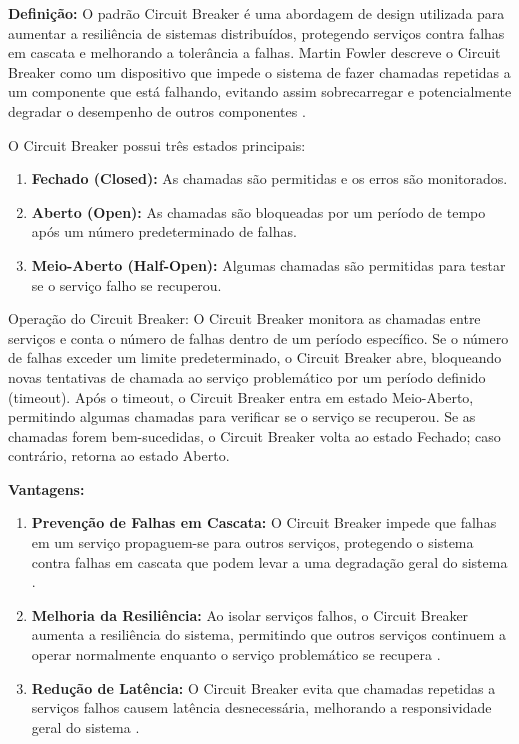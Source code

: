 \textbf{Definição:} O padrão Circuit Breaker é uma abordagem de design utilizada para aumentar a resiliência de sistemas distribuídos, protegendo serviços contra falhas em cascata e melhorando a tolerância a falhas. Martin Fowler descreve o Circuit Breaker como um dispositivo que impede o sistema de fazer chamadas repetidas a um componente que está falhando, evitando assim sobrecarregar e potencialmente degradar o desempenho de outros componentes \cite{fowler2014}.

O Circuit Breaker possui três estados principais:

\begin{enumerate}
    \item \textbf{Fechado (Closed):} As chamadas são permitidas e os erros são monitorados.
    \item \textbf{Aberto (Open):} As chamadas são bloqueadas por um período de tempo após um número predeterminado de falhas.
    \item \textbf{Meio-Aberto (Half-Open):} Algumas chamadas são permitidas para testar se o serviço falho se recuperou.

\end{enumerate}
{Operação do Circuit Breaker:} O Circuit Breaker monitora as chamadas entre serviços e conta o número de falhas dentro de um período específico. Se o número de falhas exceder um limite predeterminado, o Circuit Breaker abre, bloqueando novas tentativas de chamada ao serviço problemático por um período definido (timeout). Após o timeout, o Circuit Breaker entra em estado Meio-Aberto, permitindo algumas chamadas para verificar se o serviço se recuperou. Se as chamadas forem bem-sucedidas, o Circuit Breaker volta ao estado Fechado; caso contrário, retorna ao estado Aberto.

\textbf{Vantagens:}

\begin{enumerate}
    \item \textbf{Prevenção de Falhas em Cascata:} O Circuit Breaker impede que falhas em um serviço propaguem-se para outros serviços, protegendo o sistema contra falhas em cascata que podem levar a uma degradação geral do sistema \cite{fowler2014}.
    \item \textbf{Melhoria da Resiliência:} Ao isolar serviços falhos, o Circuit Breaker aumenta a resiliência do sistema, permitindo que outros serviços continuem a operar normalmente enquanto o serviço problemático se recupera \cite{nygard2007}.
    \item \textbf{Redução de Latência:} O Circuit Breaker evita que chamadas repetidas a serviços falhos causem latência desnecessária, melhorando a responsividade geral do sistema \cite{nygard2007}.
\end{enumerate}

